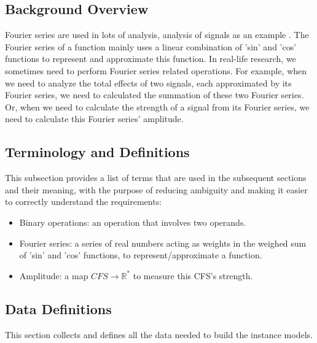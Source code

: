 \documentclass[12pt]{article}
\begin{document}
\subsection{Background Overview} \label{Sbsc:CA-Background}
Fourier series are used in lots of analysis, analysis of signals as an example 
\cite{papoulis1977signal}. The Fourier series of a function mainly uses 
a linear combination of 'sin' and 'cos' functions to represent and approximate 
this function. In real-life research, we sometimes need to perform Fourier 
series related operations. For example, when we need to analyze the total 
effects of two signals, each approximated by its Fourier series, 
we need to calculated the summation of these two Fourier series. 
Or, when we need to calculate the strength of a signal from its Fourier 
series, we need to calculate this Fourier series' amplitude.
\subsection{Terminology and Definitions}

This subsection provides a list of terms that are used in the subsequent
sections and their meaning, with the purpose of reducing ambiguity and making it
easier to correctly understand the requirements:

\begin{itemize}

\item Binary operations: an operation that involves two operands.
\item Fourier series: a series of real numbers acting as weights in the weighed sum of 'sin' and 'cos' functions, to represent/approximate a function.
\item Amplitude: a map $\mathit{CFS}\rightarrow \mathbb{R}^{*}$ to measure this CFS's strength.
\end{itemize}
\subsection{Data Definitions} \label{sec_datadef}

This section collects and defines all the data needed to build the instance
models.
~\newline
\end{document}
